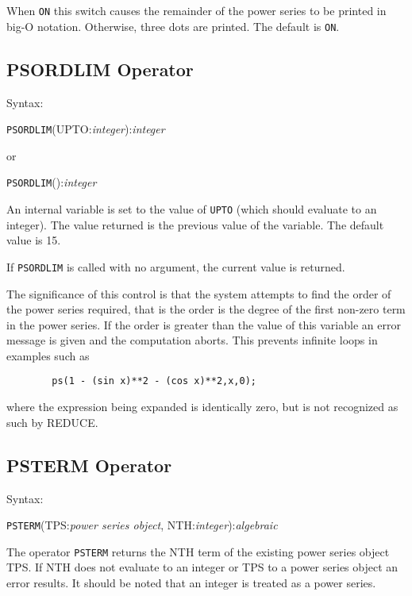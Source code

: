 When {\tt ON} this switch causes the remainder of the power series
to be printed in big-O notation.   Otherwise, three dots are printed.
 The default is {\tt ON}.

\subsection{PSORDLIM Operator}

Syntax:

\hspace*{2em} {\tt PSORDLIM}(UPTO:{\em integer}):{\em integer}

\hspace*{4em} or

\hspace*{2em} {\tt PSORDLIM}():{\em integer}

An internal variable is set to the value of {\tt UPTO} (which should
evaluate to an integer). The value returned is the previous value of
the variable.  The default value is 15.

If {\tt PSORDLIM} is called with no argument, the current value is
returned.

The significance of this control is that the system attempts to find
the order of the power series required, that is the order is the
degree of the first non-zero term in the power series.  If the order
is greater than the value of this variable an error message is given
and the computation aborts. This prevents infinite loops in examples
such as

\begin{verbatim}
        ps(1 - (sin x)**2 - (cos x)**2,x,0);
\end{verbatim}

where the expression being expanded is identically zero, but is not
recognized as such by REDUCE.


\subsection{PSTERM Operator}

Syntax:

\hspace*{2em} {\tt PSTERM}(TPS:{\em power series object},
NTH:{\em integer}):{\em algebraic}

The operator {\tt PSTERM} returns the NTH term of the existing
power series object TPS. If NTH does not evaluate to
an integer or TPS to a power series object an error results.  It
should be noted that an integer is treated as a power series.



